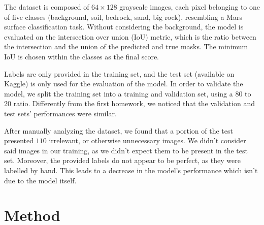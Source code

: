 \documentclass[11pt]{article}
\begin{document}
\begin{multicols}{2}

      The dataset is composed of $64\times128$ grayscale images, each pixel belonging to one of five classes (background, soil, bedrock, sand, big rock), resembling a Mars surface classification task\cite{li2024marssegmarssurfacesemantic}. Without considering the background, the model is evaluated on the intersection over union (IoU) metric, which is the ratio between the intersection and the union of the predicted and true masks. The minimum IoU is chosen within the classes as the final score.

      Labels are only provided in the training set, and the test set (available on Kaggle\cite{kaggle}) is only used for the evaluation of the model. In order to validate the model, we split the training set into a training and validation set, using a $80$ to $20$ ratio. Differently from the first homework, we noticed that the validation and test sets' performances were similar.

      After manually analyzing the dataset, we found that a portion of the test presented $110$ irrelevant, or otherwise unnecessary images. We didn't consider said images in our training, as we didn't expect them to be present in the test set. Moreover, the provided labels do not appear to be perfect, as they were labelled by hand. This leads to a decrease in the model's performance which isn't due to the model itself.

      \section{Method}



\end{multicols}
\end{document}
